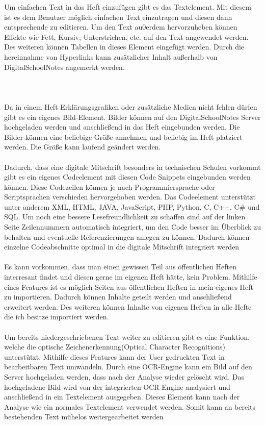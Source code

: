 Um einfachen Text in das Heft einzufügen gibt es das Textelement. Mit diesem ist es dem Benutzer möglich einfachen Text einzutragen und diesen dann entsprechende zu editieren. Um den Text au0erdem hervorzuheben können Effekte wie Fett, Kursiv, Unterstrichen, etc. auf den Text angewendet werden. Des weiteren können Tabellen in dieses Element eingefügt werden. Durch die hereinnahme von Hyperlinks kann zusätzlicher Inhalt außerhalb von DigitalSchoolNotes angemerkt werden.\\
\\\\\\
Da in einem Heft Erklärungsgrafiken oder zusätzliche Medien nicht fehlen dürfen gibt es ein eigenes Bild-Element. Bilder können auf den DigitalSchoolNotes Server hochgeladen werden und anschließend in das Heft eingebunden werden. Die Bilder können eine beliebige Größe annehmen und beliebig im Heft platziert werden. Die Größe kann laufend geändert werden.\\
\\
Dadurch, dass eine digitale Mitschrift besonders in technischen Schulen vorkommt gibt es ein eigenes Codeelement mit diesen Code Snippets eingebunden werden können. Diese Codezeilen können je nach Programmiersprache oder Scriptsprachen verschieden hervorgehoben werden. Das Codeelement unterstützt unter anderem XML, HTML, JAVA, JavaScript, PHP, Python, C, C++, C\# und SQL. Um noch eine bessere Lesefreundlichkeit zu schaffen sind auf der linken Seite Zeilennummern automatisch integriert, um den Code besser im Überblick zu behalten und eventuelle Referenzierungen anlegen zu können. Dadurch können einzelne Codeabschnitte optimal in die digitale Mitschrift integriert werden\\
\\
Es kann vorkommen, dass man einen gewissen Teil aus öffentlichen Heften interresant findet und diesen gerne im eigenen Heft hätte, kein Problem. Mithilfe eines Features ist es möglich Seiten aus öffentlichen Heften in mein eigenes Heft zu importieren. Dadurch können Inhalte geteilt werden und anschließend erweitert werden. Des weiteren können Inhalte von eigenen Heften in alle Hefte die ich besitze importiert werden.\\
\\
Um bereits niedergeschriebenen Text weiter zu editieren gibt es eine Funktion, welche die optische Zeichenerkennung(Optical Character Recognitions) unterstützt. Mithilfe dieses Features kann der User gedruckten Text in bearbeitbaren Text umwandeln. Durch eine OCR-Engine kann ein Bild auf den Server hochgeladen werden, dass nach der Analyse wieder gelöscht wird. Das hochgeladene Bild wird von der integrierten OCR-Engine analysiert und anschließend in ein Textelement ausgegeben. Dieses Element kann nach der Analyse wie ein normales Textelement verwendet werden. Somit kann an bereits bestehenden Text mühelos weitergearbeitet werden\\
